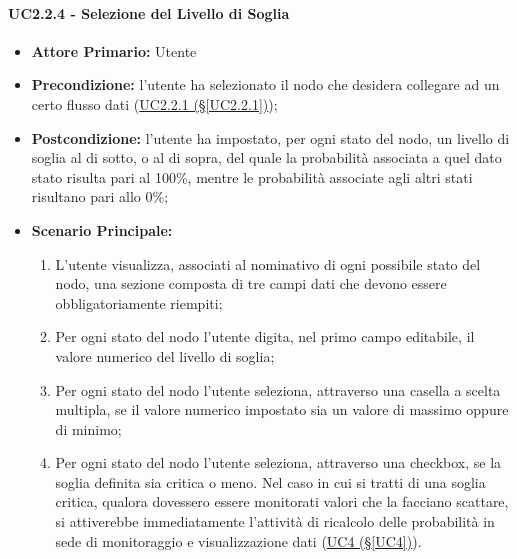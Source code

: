 \paragraph{UC2.2.4 - Selezione del Livello di Soglia}\label{UC2.2.4}
\begin{itemize}
\item \textbf{Attore Primario:} Utente
\item \textbf{Precondizione:} l'utente ha selezionato il nodo che desidera collegare ad un certo flusso dati 					(\hyperref[UC2.2.1]{UC2.2.1 (§\ref*{UC2.2.1})});
\item \textbf{Postcondizione:} l'utente ha impostato, per ogni stato del nodo, un livello di soglia al di sotto, o al di sopra,	del quale la probabilità associata a quel dato stato risulta pari al 100\%, mentre le probabilità associate agli altri stati risultano pari allo 0\%;
\item \textbf{Scenario Principale:}
	\begin{enumerate}
	\item L'utente visualizza, associati al nominativo di ogni possibile stato del nodo, una sezione composta di tre campi dati che devono essere obbligatoriamente riempiti;
	\item Per ogni stato del nodo l'utente digita, nel primo campo editabile, il valore numerico del livello di soglia;
	\item Per ogni stato del nodo l'utente seleziona, attraverso una casella a scelta multipla, se il valore numerico impostato sia un valore di massimo oppure di minimo;
	\item Per ogni stato del nodo l'utente seleziona, attraverso una checkbox, se la soglia definita sia critica o meno. Nel caso in cui si tratti di una soglia critica, qualora dovessero essere monitorati valori che la facciano scattare, si attiverebbe immediatamente l'attività di ricalcolo delle probabilità in sede di monitoraggio e visualizzazione dati (\hyperref[UC4]{UC4 (§\ref*{UC4})}).
	\end{enumerate}
\end{itemize}

